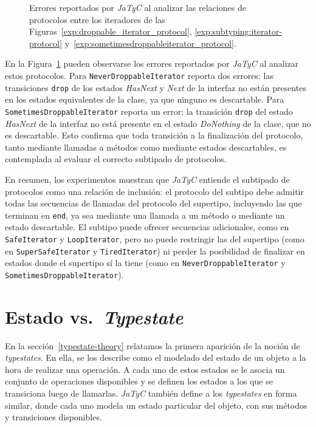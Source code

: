 \begin{figure}[htbp]
    \centering
    
    \caption{Errores reportados por \textit{JaTyC} al analizar las relaciones de protocolos entre los iteradores de las Figuras~\ref{exp:droppable_iterator_protocol}, \ref{exp:subtyping:iterator-protocol} y~\ref{exp:sometimesdroppableiterator_protocol}.}
    \label{exp:subtyping:drop-error}
\end{figure}

En la Figura~\ref{exp:subtyping:drop-error} pueden observarse los errores reportados por \textit{JaTyC} al analizar estos protocolos. Para \texttt{NeverDroppableIterator} reporta dos errores: las transiciones \texttt{drop} de los estados \textit{HasNext} y \textit{Next} de la interfaz no están presentes en los estados equivalentes de la clase, ya que ninguno es descartable. Para \texttt{SometimesDroppableIterator} reporta un error: la transición \texttt{drop} del estado \textit{HasNext} de la interfaz no está presente en el estado \textit{DoNothing} de la clase, que no es descartable. Esto confirma que toda transición a la finalización del protocolo, tanto mediante llamadas a métodos como mediante estados descartables, es contemplada al evaluar el correcto subtipado de protocolos.

En resumen, los experimentos muestran que \textit{JaTyC} entiende el subtipado de protocolos como una relación de inclusión: el protocolo del subtipo debe admitir todas las secuencias de llamadas del protocolo del supertipo, incluyendo las que terminan en \texttt{end}, ya sea mediante una llamada a un método o mediante un estado descartable. El subtipo puede ofrecer secuencias adicionales, como en \texttt{SafeIterator} y \texttt{LoopIterator}, pero no puede restringir las del supertipo (como en \texttt{SuperSafeIterator} y \texttt{TiredIterator}) ni perder la posibilidad de finalizar en estados donde el supertipo sí la tiene (como en \texttt{NeverDroppableIterator} y \texttt{SometimesDroppableIterator}).

\section{Estado vs.\ \textit{Typestate}}
\label{sec:estado-typestate}

En la sección~\ref{typestate-theory} relatamos la primera aparición de la noción de \textit{typestates}. En ella, se los describe como el modelado del estado de un objeto a la hora de realizar una operación. A cada uno de estos estados se le asocia un conjunto de operaciones disponibles y se definen los estados a los que se transiciona luego de llamarlas. \textit{JaTyC} también define a los \textit{typestates} en forma similar, donde cada uno modela un estado particular del objeto, con sus métodos y transiciones disponibles.

